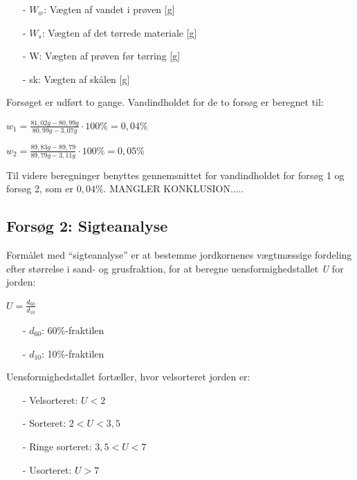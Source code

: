 \begin{itemize}
	\item[-] $W_w$: Vægten af vandet i prøven [g]
	\item[-] $W_s$: Vægten af det tørrede materiale [g]
	\item[-] W: Vægten af prøven før tørring [g]
	\item[-] sk: Vægten af skålen [g]
\end{itemize}

Forsøget er udført to gange. Vandindholdet for de to forsøg er beregnet til:

\begin{center}
	$w_1 = \frac{81,\!02 g - 80,\!99 g}{80,\!99 g - 3,\!07 g}\cdot 100\% = 0,\!04\%$
\end{center}

\begin{center}
	$w_2 = \frac{89,\!83 g - 89,\!79}{89,\!79 g - 3,\!11 g}\cdot 100\% = 0,\!05\%$
\end{center}

Til videre beregninger benyttes gennemsnittet for vandindholdet for forsøg 1 og forsøg 2, som er $0,\!04$\%. 
\newline
\newline
MANGLER KONKLUSION.....

\subsection{Forsøg 2: Sigteanalyse}
Formålet med “sigteanalyse” er at bestemme jordkornenes vægtmæssige fordeling efter størrelse i sand- og grusfraktion, for at beregne uensformighedstallet \textit{U} for jorden:

\begin{center}
	$U = \frac{d_{60}}{d_{10}}$
\end{center}

\begin{itemize}
	\item[-] $d_{60}$: 60\%-fraktilen
	\item[-] $d_{10}$: 10\%-fraktilen
\end{itemize}

Uensformighedstallet fortæller, hvor velsorteret jorden er:

\begin{itemize}
	\item[-] Velsorteret: $U < 2$
	\item[-] Sorteret: $2 < U < 3,\!5$
	\item[-] Ringe sorteret: $3,\!5 < U < 7$
	\item[-] Usorteret: $U > 7$
\end{itemize}

